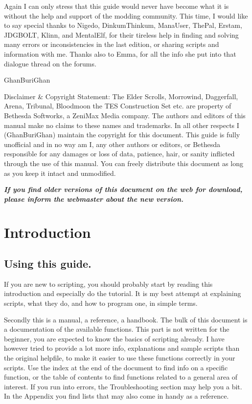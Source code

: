 \documentclass[oneside]{article}
\begin{document}
Again I can only stress that this guide would never have become what it is without the help and support of the modding community. This time, I would like to say special thanks to Nigedo, DinkumThinkum, ManaUser, ThePal, Erstam, JDGBOLT, Klinn, and MentalElf, for their tireless help in finding and solving many errors or inconsistencies in the last edition, or sharing scripts and information with me. Thanks also to Emma, for all the info she put into that dialogue thread on the forums.

GhanBuriGhan

Disclaimer \& Copyright Statement: The Elder Scrolls, Morrowind, Daggerfall, Arena, Tribunal, Bloodmoon the TES Construction Set etc. are property of Bethesda Softworks, a ZeniMax Media company. The authors and editors of this manual make no claims to these names and trademarks. In all other respects I (GhanBuriGhan) maintain the copyright for this document. This guide is fully unofficial and in no way am I, any other authors or editors, or Bethesda responsible for any damages or loss of data, patience, hair, or sanity inflicted through the use of this manual. You can freely distribute this document as long as you keep it intact and unmodified.

\emph{\textbf{If you find older versions of this document on the web for
download, please inform the webmaster about the new version.}}


\section{Introduction}

\hypertarget{using-this-guide.}{%
\subsection{Using this guide.}\label{using-this-guide.}}

If you are new to scripting, you should probably start by reading this introduction and especially do the tutorial. It is my best attempt at explaining scripts, what they do, and how to program one, in simple terms.

Secondly this is a manual, a reference, a handbook. The bulk of this document is a documentation of the available functions. This part is not written for the beginner, you are expected to know the basics of scripting already. I have however tried to provide a lot more info, explanations and sample scripts than the original helpfile, to make it easier to use these functions correctly in your scripts. Use the index at the end of the document to find info on a specific function, or the table of contents to find functions related to a general area of
interest. If you run into errors, the Troubleshooting section may help you a bit. In the Appendix you find lists that may also come in handy as a reference.
\end{document}
